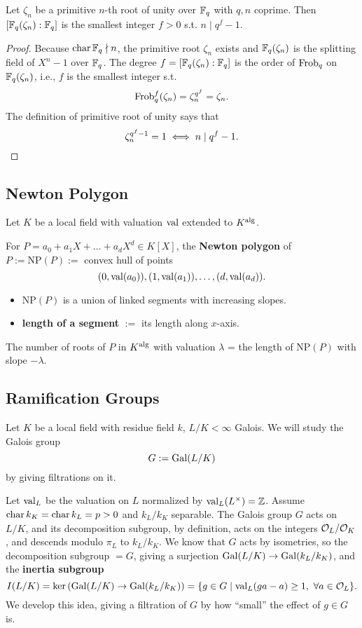\begin{lemma}\label{cyclotomic extension of finite fields}
    Let $\zeta_n$ be a primitive $n$-th root of unity over $\mathbb{F}_q$ with $q, n$ coprime. Then $[\mathbb{F}_q(\zeta_n) : \mathbb{F}_q]$ is the smallest integer $f > 0$ s.t. $n \mid q^f - 1$.
\end{lemma}
\begin{proof}
    Because $\operatorname{char}\mathbb{F}_q\nmid n$, the primitive root $\zeta_n$ exists and $\mathbb{F}_q(\zeta_n)$ is the splitting field of $X^n - 1$ over $\mathbb{F}_q$.
    The degree $f = [\mathbb{F}_q(\zeta_n) : \mathbb{F}_q]$ is the order of $\operatorname{Frob}_q$ on $\mathbb{F}_q(\zeta_n)$, i.e., $f$ is the smallest integer s.t. \[\operatorname{Frob}_q^f(\zeta_n) = \zeta_n^{q^f} = \zeta_n.\] The definition of primitive root of unity says that \[\zeta_n^{q^f -1} = 1\iff n \mid q^f - 1.\qedhere\]
\end{proof}

\subsection{Newton Polygon}
Let $K$ be a local field with valuation $\operatorname{val}$ extended to $K^{\mathrm{alg}}$.

For $P = a_0 + a_1 X + \dots + a_dX^d\in K[X]$,
the \textbf{Newton polygon} of $P := \mathrm{NP}(P) := $ convex hull of points \[(0, \operatorname{val}(a_0)), (1, \operatorname{val}(a_1)),\dots, (d, \operatorname{val}(a_d)).\]
\begin{itemize}
    \item $\mathrm{NP}(P)$ is a union of linked segments with increasing slopes.
    \item \textbf{length of a segment} $:=$ its length along $x$-axis.
\end{itemize}

\begin{theorem}
    The number of roots of $P$ in $K^{\mathrm{alg}}$ with valuation $\lambda$ = the length of $\mathrm{NP}(P)$ with slope $-\lambda$.
\end{theorem}

\subsection{Ramification Groups}

Let $K$ be a local field with residue field $k$, $L/K<\infty$ Galois. We will study the Galois group \[G := \operatorname{Gal}(L/K)\] by giving filtrations on it.

Let $\operatorname{val}_L$ be the valuation on $L$ normalized by $\operatorname{val}_L(L^\times) = \mathbb{Z}$.
Assume $\operatorname{char} k_K = \operatorname{char} k_L = p > 0$ and $k_L/k_K$ separable.
The Galois group $G$ acts on $L/K$,
and its decomposition subgroup, by definition, acts on the integers $\mathcal{O}_L/\mathcal{O}_K$, and descends modulo $\pi_L$ to $k_L/k_K$.
We know that $G$ acts by isometries,
so the decomposition subgroup $= G$,
giving a surjection $\operatorname{Gal}(L/K)\to \operatorname{Gal}(k_L/k_K)$,
and the \textbf{inertia subgroup}\[I(L/K) = \ker\left( \operatorname{Gal}(L/K)\to\operatorname{Gal}(k_L/k_K) \right) = \{g\in G\mid \operatorname{val}_L(ga - a)\ge 1,\ \forall a\in\mathcal{O}_L\}.\]
We develop this idea, giving a filtration of $G$ by how ``small'' the effect of $g\in G$ is.

